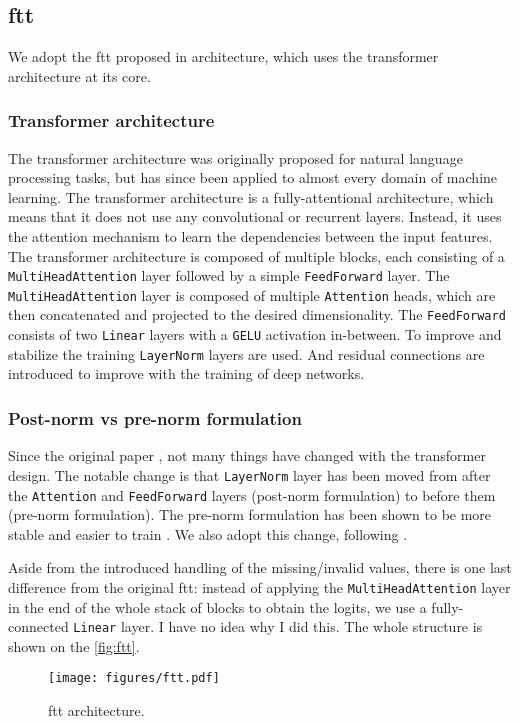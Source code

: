 \subsection[ft-transformer]{\gls{ftt}}

We adopt the \gls{ftt} proposed in \cite{ft-transformer} architecture, which uses the transformer \cite{transformer}
architecture at its core.

\subsubsection{Transformer architecture}

The transformer architecture was originally proposed for natural language processing tasks, but has since been applied
to almost every domain of machine learning. The transformer architecture is a fully-attentional architecture, which
means that it does not use any convolutional \cite{convolutional} or recurrent \cite{recurrent} layers. Instead, it uses
the attention mechanism to learn the dependencies between the input features. The transformer architecture is composed
of multiple blocks, each consisting of a \verb|MultiHeadAttention| layer followed by a simple \verb|FeedForward| layer.
The \verb|MultiHeadAttention| layer is composed of multiple \verb|Attention| heads, which are then concatenated and
projected to the desired dimensionality. The \verb|FeedForward| consists of two \verb|Linear| layers with a \verb|GELU|
activation in-between. To improve and stabilize the training \verb|LayerNorm| \cite{layernorm} layers are used. And
residual connections are introduced to improve with the training of deep networks.

\subsubsection{Post-norm vs pre-norm formulation}

Since the original paper \cite{transformer}, not many things have changed with the transformer design. The notable
change is that \verb|LayerNorm| layer has been moved from after the \verb|Attention| and \verb|FeedForward| layers
(post-norm formulation) to before them (pre-norm formulation). The pre-norm formulation has been shown to be more
stable and easier to train \cite{pre-norm}. We also adopt this change, following \cite{ft-transformer}.

Aside from the introduced handling of the missing/invalid values, there is one last difference from the original
\gls{ftt}: instead of applying the \verb|MultiHeadAttention| layer in the end of the whole stack of blocks to obtain
the logits, we use a fully-connected \verb|Linear| layer. I have no idea why I did this. The whole structure is shown
on the \autoref{fig:ftt}.

\begin{figure}[htbp]
    \centering
    \texttt{[image: figures/ftt.pdf]}
    \caption{\gls{ftt} architecture.}
    \label{fig:ftt}
\end{figure}
